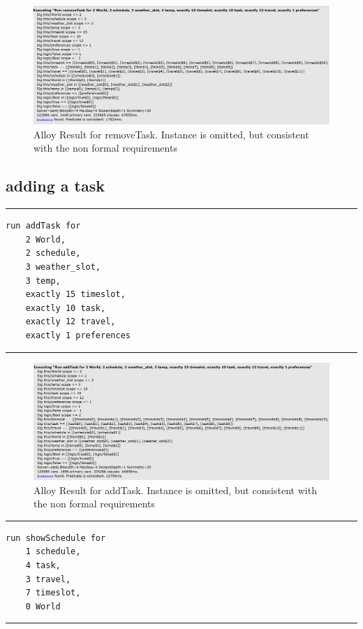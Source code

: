 \begin{figure}[H]
\centering
\includegraphics[scale=0.55]{Pictures/removeTask.PNG}
\caption{Alloy Result for removeTask. Instance is omitted, but
consistent with the non formal requirements}
\end{figure}
\subsection{adding a task}
\rule{\textwidth}{0.4pt}
\begin{verbatim}
run addTask for
    2 World,
    2 schedule,
    3 weather_slot,
    3 temp,
    exactly 15 timeslot, 
    exactly 10 task,
    exactly 12 travel,
    exactly 1 preferences
\end{verbatim}
\rule{\textwidth}{0.4pt}

\begin{figure}[H]
\centering
\includegraphics[scale=0.55]{Pictures/addTask.PNG}
\caption{Alloy Result for addTask. Instance is omitted, but
consistent with the non formal requirements}
\end{figure}

\rule{\textwidth}{0.4pt}
\begin{verbatim}
run showSchedule for  
    1 schedule, 
    4 task, 
    3 travel, 
    7 timeslot, 
    0 World
\end{verbatim}
\rule{\textwidth}{0.4pt}

